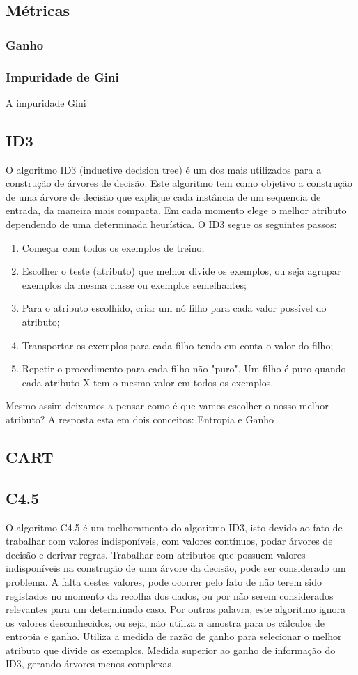 \documentclass[12pt,a4paper]{article}
\begin{document}
\subsection{Métricas}
\subsubsection{Ganho}

\subsubsection{Impuridade de Gini}
A impuridade Gini

\subsection{ID3}
O algoritmo ID3 (inductive decision tree) é um dos mais utilizados para a construção de árvores de decisão. Este algoritmo tem como objetivo a construção de uma árvore de decisão que explique cada instância de um sequencia de entrada, da maneira mais compacta. Em cada momento elege o melhor atributo dependendo de uma determinada heurística.  
O ID3 segue os seguintes passos:
\begin{enumerate}
	\item 	Começar com todos os exemplos de treino;
	\item	Escolher o teste (atributo) que melhor divide os exemplos, ou seja agrupar exemplos da mesma classe ou exemplos semelhantes;
	\item	Para o atributo escolhido, criar um nó filho para cada valor possível do atributo;
	\item	Transportar os exemplos para cada filho tendo em conta o valor do filho;
	\item	Repetir o procedimento para cada filho não "puro". Um filho é puro quando cada atributo X tem o mesmo valor em todos os exemplos. 
\end{enumerate}
Mesmo assim deixamos a pensar como é que vamos escolher o nosso melhor atributo?  A resposta esta em dois conceitos: Entropia e Ganho
\subsection{CART}


\subsection{C4.5}
O algoritmo C4.5 é um melhoramento do algoritmo ID3, isto devido ao fato de trabalhar com valores indisponíveis, com valores contínuos, podar árvores de decisão e derivar regras.
Trabalhar com atributos que possuem valores indisponíveis na construção de uma árvore da decisão, pode ser considerado um problema. A falta destes valores, pode ocorrer pelo fato de não terem sido registados no momento da recolha dos dados, ou por não serem considerados relevantes para um determinado caso.
Por outras palavra, este algoritmo ignora os valores desconhecidos, ou seja, não utiliza a amostra para os cálculos de entropia e ganho.
Utiliza a medida de razão de ganho para selecionar o melhor atributo que divide os exemplos. Medida superior ao ganho de informação do ID3, gerando árvores menos complexas.
\end{document}
